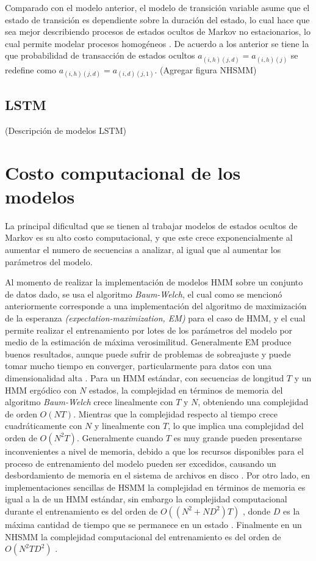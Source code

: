 Comparado con el modelo anterior, el modelo de transición variable asume que el estado de transición es dependiente sobre la duración del estado, lo cual hace que sea mejor describiendo procesos de estados ocultos de Markov no estacionarios, lo cual permite modelar procesos homogéneos \cite{Yu2016}. De acuerdo a los anterior se tiene la que probabilidad de transacción de estados ocultos $a_{(i,h)(j,d)} = a_{(i,h)(j)}$ se redefine como $a_{(i,h)(j,d)} = a_{(i,d)(j,1)}$. (Agregar figura NHSMM)

\subsection{LSTM}
(Descripción de modelos LSTM)



\section{Costo computacional de los modelos} %
\label{section3.2}

La principal dificultad que se tienen al trabajar modelos de estados ocultos de Markov es su alto costo computacional, y que este crece exponencialmente al aumentar el numero de secuencias a analizar, al igual que al aumentar los parámetros del modelo. 

Al momento de realizar la implementación de modelos HMM sobre un conjunto de datos dado, se usa el algoritmo \textit{Baum-Welch}, el cual como se mencionó anteriormente corresponde a una implementación del algoritmo de maximización de la esperanza \textit{(expectation-maximization, EM)} para el caso de HMM, y el cual permite realizar el entrenamiento por lotes de los parámetros del modelo por medio de la estimación de máxima verosimilitud. Generalmente EM produce buenos resultados, aunque puede sufrir de problemas de sobreajuste y puede tomar mucho tiempo en converger, particularmente para datos con una dimensionalidad alta \cite{Panuccio2002}. Para un HMM estándar, con secuencias de longitud $T$ y un HMM ergódico con $N$ estados, la complejidad en términos de memoria del algoritmo \textit{Baum-Welch} crece linealmente con $T$ y $N$, obteniendo una complejidad de orden $O(NT)$. Mientras que la complejidad respecto al tiempo crece cuadráticamente con $N$ y linealmente con $T$, lo que implica una complejidad del orden de $O(N^2T)$. Generalmente cuando $T$ es muy grande pueden presentarse inconvenientes a nivel de memoria, debido a que los recursos disponibles para el proceso de entrenamiento del modelo pueden ser excedidos, causando un desbordamiento de memoria en el sistema de archivos en disco \cite{Khreich2010,Yu2010}. Por otro lado, en implementaciones sencillas de HSMM la complejidad en términos de memoria es igual a la de un HMM estándar, sin embargo la complejidad computacional durante el entrenamiento es del orden de $O((N^2 + ND^2 )T )$ , donde $D$ es la máxima cantidad de tiempo que se permanece en un estado \cite{Yu2010}. Finalmente en un NHSMM la complejidad computacional del entrenamiento es del orden de $O (N^2 T D^2 )$ \cite{Marhasev2006}.

